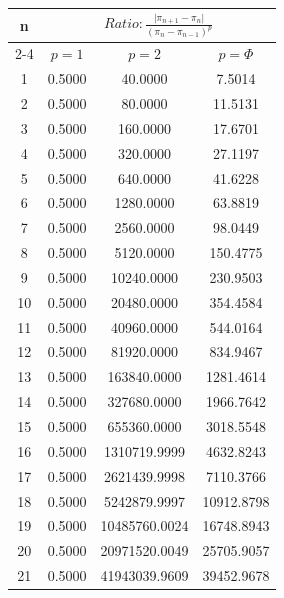 \documentclass{article}
\providecommand{\abs}[1]{\lvert#1\rvert}
\begin{document}
\begin{tabular}{|c|c|c|c|}
\hline
\multirow{2}{*}{n} & \multicolumn{3}{|c|}{$Ratio:\displaystyle\frac{\abs{\pi_{n+1}-\pi_{n}}}{({\pi_{n}-\pi_{n-1}})^p}$} \\
\cline{2-4}
 & $p=1$ & $p=2$ & $p=\Phi$ \\
\hline
 1 & 0.5000 & 40.0000 & 7.5014 \\ 
  2 & 0.5000 & 80.0000 & 11.5131 \\ 
  3 & 0.5000 & 160.0000 & 17.6701 \\ 
  4 & 0.5000 & 320.0000 & 27.1197 \\ 
  5 & 0.5000 & 640.0000 & 41.6228 \\ 
  6 & 0.5000 & 1280.0000 & 63.8819 \\ 
  7 & 0.5000 & 2560.0000 & 98.0449 \\ 
  8 & 0.5000 & 5120.0000 & 150.4775 \\ 
  9 & 0.5000 & 10240.0000 & 230.9503 \\ 
 10 & 0.5000 & 20480.0000 & 354.4584 \\ 
 11 & 0.5000 & 40960.0000 & 544.0164 \\ 
 12 & 0.5000 & 81920.0000 & 834.9467 \\ 
 13 & 0.5000 & 163840.0000 & 1281.4614 \\ 
 14 & 0.5000 & 327680.0000 & 1966.7642 \\ 
 15 & 0.5000 & 655360.0000 & 3018.5548 \\ 
 16 & 0.5000 & 1310719.9999 & 4632.8243 \\ 
 17 & 0.5000 & 2621439.9998 & 7110.3766 \\ 
 18 & 0.5000 & 5242879.9997 & 10912.8798 \\ 
 19 & 0.5000 & 10485760.0024 & 16748.8943 \\ 
 20 & 0.5000 & 20971520.0049 & 25705.9057 \\ 
 21 & 0.5000 & 41943039.9609 & 39452.9678 \\ 
 \hline 
\end{tabular}
\end{document}
